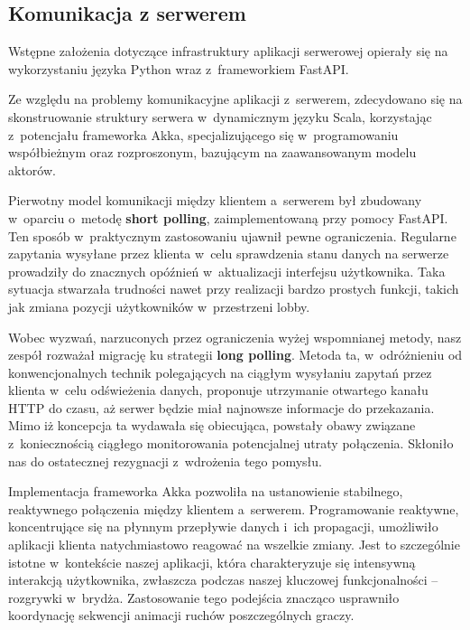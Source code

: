 \FloatBarrier

\subsection{Komunikacja z serwerem}
Wstępne założenia dotyczące infrastruktury aplikacji
serwerowej opierały się na wykorzystaniu języka Python
wraz z~frameworkiem FastAPI.

Ze względu na problemy komunikacyjne aplikacji
z~serwerem, zdecydowano się na skonstruowanie struktury serwera
w~dynamicznym języku Scala, korzystając z~potencjału
frameworka Akka, specjalizującego się w~programowaniu
współbieżnym oraz rozproszonym, bazującym na
zaawansowanym modelu aktorów.

Pierwotny model komunikacji między klientem a~serwerem
był zbudowany w~oparciu o~metodę \textbf{short polling},
zaimplementowaną przy pomocy FastAPI. Ten sposób
w~praktycznym zastosowaniu ujawnił pewne ograniczenia.
Regularne zapytania wysyłane przez klienta w~celu
sprawdzenia stanu danych na serwerze prowadziły do
znacznych opóźnień w~aktualizacji interfejsu
użytkownika. Taka sytuacja stwarzała trudności nawet
przy realizacji bardzo prostych funkcji, takich jak
zmiana pozycji użytkowników w~przestrzeni lobby.

Wobec wyzwań, narzuconych przez ograniczenia wyżej wspomnianej metody, nasz
zespół rozważał migrację ku strategii \textbf{long polling}. Metoda ta,
w~odróżnieniu od konwencjonalnych technik polegających na ciągłym
wysyłaniu zapytań przez klienta w~celu odświeżenia danych, proponuje
utrzymanie otwartego kanału HTTP do czasu, aż serwer będzie miał
najnowsze informacje do przekazania. Mimo iż koncepcja ta wydawała się
obiecująca, powstały obawy związane z~koniecznością ciągłego monitorowania
potencjalnej utraty połączenia. Skłoniło nas do ostatecznej rezygnacji
z~wdrożenia tego pomysłu.

Implementacja frameworka Akka \cite{Akka} pozwoliła na ustanowienie stabilnego,
reaktywnego połączenia między klientem a~serwerem. Programowanie
reaktywne, koncentrujące się na płynnym przepływie danych i~ich propagacji,
umożliwiło aplikacji klienta natychmiastowo reagować na wszelkie zmiany. Jest
to szczególnie istotne w~kontekście naszej aplikacji, która charakteryzuje
się intensywną interakcją użytkownika, zwłaszcza podczas naszej kluczowej
funkcjonalności -- rozgrywki w~brydża. Zastosowanie tego podejścia
znacząco usprawniło koordynację sekwencji animacji ruchów poszczególnych
graczy.

